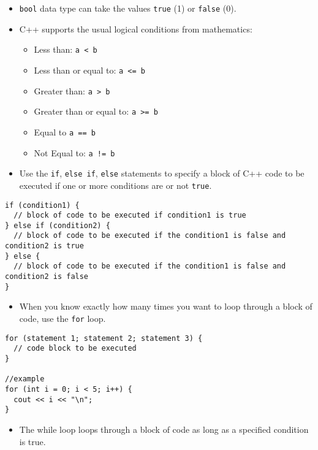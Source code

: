 \begin{itemize}
\tightlist
\item
  \texttt{bool} data type can take the values \texttt{true} (1) or \texttt{false} (0).
\item
  C++ supports the usual logical conditions from mathematics:

  \begin{itemize}
  \tightlist
  \item
    Less than: \texttt{a\ \textless{}\ b}
  \item
    Less than or equal to: \texttt{a\ \textless{}=\ b}
  \item
    Greater than: \texttt{a\ \textgreater{}\ b}
  \item
    Greater than or equal to: \texttt{a\ \textgreater{}=\ b}
  \item
    Equal to \texttt{a\ ==\ b}
  \item
    Not Equal to: \texttt{a\ !=\ b}
  \end{itemize}
\item
  Use the \texttt{if}, \texttt{else\ if}, \texttt{else} statements to specify a block of C++ code to be executed if one or more conditions are or not \texttt{true}.
\end{itemize}

\begin{verbatim}
if (condition1) {
  // block of code to be executed if condition1 is true
} else if (condition2) {
  // block of code to be executed if the condition1 is false and condition2 is true
} else {
  // block of code to be executed if the condition1 is false and condition2 is false
}
\end{verbatim}

\begin{itemize}
\tightlist
\item
  When you know exactly how many times you want to loop through a block of code, use the \texttt{for} loop.
\end{itemize}

\begin{verbatim}
for (statement 1; statement 2; statement 3) {
  // code block to be executed
}

//example
for (int i = 0; i < 5; i++) {
  cout << i << "\n";
}
\end{verbatim}

\begin{itemize}
\tightlist
\item
  The while loop loops through a block of code as long as a specified condition is true.
\end{itemize}

